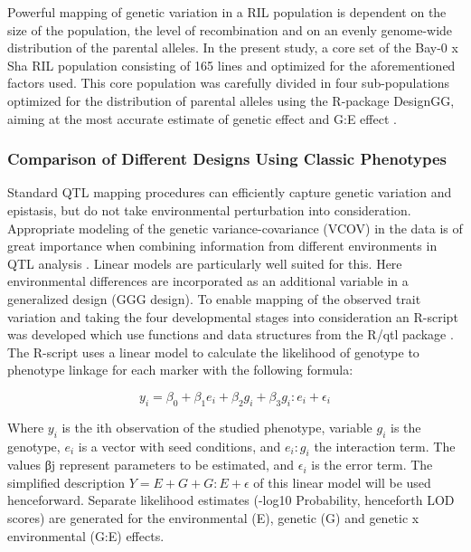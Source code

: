 Powerful mapping of genetic variation in a RIL population is dependent on the size of the population, the level 
of recombination and on an evenly genome-wide distribution of the parental alleles. In the present study, a core 
set of the Bay-0 x Sha RIL population \cite{Loudet:2002} consisting of 165 lines and optimized for the 
aforementioned factors used. This core population was carefully divided in four sub-populations optimized for 
the distribution of parental alleles using the R-package DesignGG, aiming at the most accurate estimate of genetic 
effect and G:E effect \cite{Li:2009}.

\subsubsection{Comparison of Different Designs Using Classic Phenotypes}
Standard QTL mapping procedures can efficiently capture genetic variation and epistasis, but do not take 
environmental perturbation into consideration. Appropriate modeling of the genetic variance-covariance (VCOV) 
in the data is of great importance when combining information from different environments in QTL analysis 
\cite{Churchill:2002}. Linear models are particularly well suited for this. Here environmental differences are 
incorporated as an additional variable in a generalized design (GGG design). To enable mapping of the observed 
trait variation and taking the four developmental stages into consideration an R-script was developed which use 
functions and data structures from the R/qtl package \cite{Broman:2003, Arends:2010}.
The R-script uses a linear model to calculate the likelihood of genotype to phenotype linkage for each marker 
with the following formula:

$$ y_{i}   =   \beta_{0} + \beta_{1}e_{i} + \beta_{2}g_{i} + \beta_{3}g_{i}:e_{i} + \epsilon_{i} $$

Where $y_{i}$ is the ith observation of the studied phenotype, variable $g_{i}$ is the genotype, $e_{i}$ is a vector with seed 
conditions, and $e_{i}:g_{i}$ the interaction term. The values βj represent parameters to be estimated, and $\epsilon_{i}$ is the 
error term. The simplified description $Y = E + G + G:E + \epsilon$ of this linear model will be used henceforward. Separate 
likelihood estimates (-log10 Probability, henceforth LOD scores) are generated for the environmental (E), genetic 
(G) and genetic x environmental (G:E) effects. 

